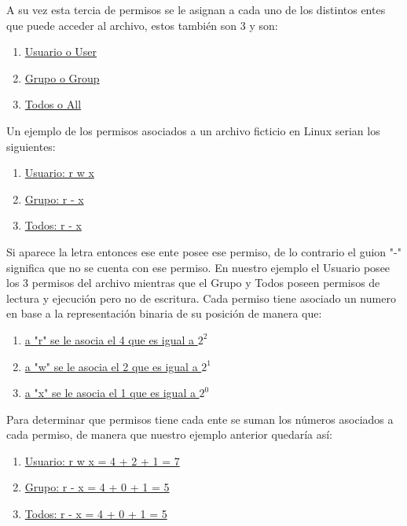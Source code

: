 \documentclass[letterpaper, 12pt, oneside]{article}
\begin{document}
	A su vez esta tercia de permisos se le asignan a cada uno de los distintos entes que puede acceder al archivo, estos también son 3 y son:
	\\
	\begin{enumerate}
		\item \underline{Usuario o User}
		\item \underline{Grupo o Group}
		\item \underline{Todos o All}
	\\
	\end{enumerate}
	Un ejemplo de los permisos asociados a un archivo ficticio en Linux serian los siguientes:
	\\
	\begin{enumerate}
		\item \underline{Usuario: r w x}
		\item \underline{Grupo: r - x}
		\item \underline{Todos: r - x}
	\\
	\end{enumerate}
	Si aparece la letra entonces ese ente posee ese permiso, de lo contrario el guion "-" significa que no se cuenta con ese permiso. En nuestro ejemplo el Usuario posee los 3 permisos del archivo mientras que el Grupo y Todos poseen permisos de lectura y ejecución pero no de escritura. Cada permiso tiene asociado un numero en base a la representación binaria de su posición de manera que:
	\\
	\begin{enumerate} 
		\item \underline{a "r" se le asocia el 4 que es igual a $2^{2}$}
		\item \underline{a "w" se le asocia el 2 que es igual a $2^{1}$}
		\item \underline{a "x" se le asocia el 1 que es igual a $2^{0}$}
	\\
	\end{enumerate}
	Para determinar que permisos tiene cada ente se suman los números asociados a cada permiso, de manera que nuestro ejemplo anterior quedaría así:
	\\
	\begin{enumerate}
		\item \underline{Usuario: r w x = 4 + 2 + 1 = 7}
		\item \underline{Grupo: r - x = 4 + 0 + 1 = 5}
		\item \underline{Todos: r - x = 4 + 0 + 1 = 5}
	\\
	\end{enumerate}
\end{document}
